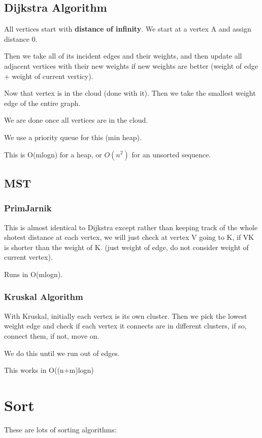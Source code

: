 \documentclass[12pt,letterpaper]{article} \usepackage{amsmath} \usepackage{graphicx} \usepackage[margin=1in]{geometry} \usepackage{longtable}  \usepackage{amssymb}
\begin{document}
	\subsection{Dijkstra Algorithm}
	All vertices start with \textbf{distance of infinity}. We start at a vertex A and assign distance 0. 
	
	Then we take all of its incident edges and their weights, and then update all adjacent vertices with their new weights if new weights are better (weight of edge + weight of current verticy).
	
	Now that vertex is in the cloud (done with it). Then we take the smallest weight edge of the entire graph. 
	
	We are done once all vertices are in the cloud. 
	
	We use a priority queue for this (min heap).
	
	This is O(mlogn) for a heap, or $O(n^2)$ for an unsorted sequence.  
	
	\subsection{MST}
	
	\subsubsection{PrimJarnik}
	This is almost identical to Dijkstra except rather than keeping track of the whole shotest distance at each vertex, we will just check at vertex V going to K, if VK is shorter than the weight of K. (just weight of edge, do not consider weight of current vertex).
	
	Runs in O(mlogn).
	
	\subsubsection{Kruskal Algorithm}
	With Kruskal, initially each vertex is its own cluster. Then we pick the lowest weight edge and check if each vertex it connects are in different clusters, if so, connect them, if not, move on.
	
	We do this until we run out of edges. 
	
	This works in O((n+m)logn)
	
	\section{Sort}
	These are lots of sorting algorithms:
	
\end{document}
